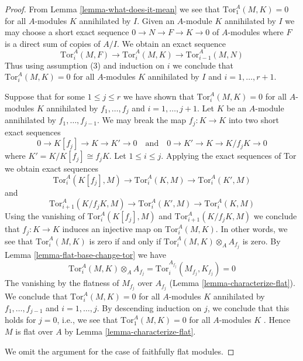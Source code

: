 \begin{proof}
From Lemma \ref{lemma-what-does-it-mean} we see that
$\text{Tor}_1^A(M, K) = 0$ for all $A$-modules $K$ annihilated by $I$.
Given an $A$-module $K$ annihilated by $I$ we may choose a short
exact sequence $0 \to N \to F \to K \to 0$ of $A$-modules where $F$
is a direct sum of copies of $A/I$. We obtain an exact sequence
$$
\text{Tor}_i^A(M, F) \to
\text{Tor}_i^A(M, K) \to
\text{Tor}_{i - 1}^A(M, N)
$$
Thus using assumption (3) and induction on $i$
we conclude that $\text{Tor}_i^A(M, K) = 0$
for all $A$-modules $K$ annihilated by $I$ and $i = 1, \ldots, r + 1$.

\medskip\noindent
Suppose that for some $1 \leq j \leq r$
we have shown that $\text{Tor}_i^A(M, K) = 0$
for all $A$-modules $K$ annihilated by $f_1, \ldots, f_j$
and $i = 1, \ldots, j + 1$.
Let $K$ be an $A$-module annihilated by $f_1, \ldots, f_{j - 1}$.
We may break the map $f_j : K \to K$ into two short exact sequences
$$
0 \to K[f_j] \to K \to K' \to 0
\quad\text{and}\quad
0 \to K' \to K \to K/f_jK \to 0
$$
where $K' = K/K[f_j] \cong f_jK$. Let $1 \leq i \leq j$.  Applying the exact
sequences of Tor we obtain exact sequences
$$
\text{Tor}_i^A(K[f_j], M) \to
\text{Tor}_i^A(K, M) \to
\text{Tor}_i^A(K', M)
$$
and
$$
\text{Tor}_{i + 1}^A(K/f_jK, M) \to
\text{Tor}_i^A(K', M) \to
\text{Tor}_i^A(K, M)
$$
Using the vanishing of $\text{Tor}_i^A(K[f_j], M)$ and
$\text{Tor}_{i + 1}^A(K/f_jK, M)$ we conclude that $f_j : K \to K$
induces an injective map on $\text{Tor}^A_i(M, K)$.
In other words, we see that $\text{Tor}^A_i(M, K)$
is zero if and only if $\text{Tor}^A_i(M, K) \otimes_A A_{f_j}$ is zero.
By Lemma \ref{lemma-flat-base-change-tor} we have
$$
\text{Tor}^A_i(M, K) \otimes_A A_{f_j} =
\text{Tor}^{A_{f_j}}_i(M_{f_j}, K_{f_j})  = 0
$$
The vanishing by the flatness of $M_{f_j}$ over $A_{f_j}$
(Lemma \ref{lemma-characterize-flat}).
We conclude that $\text{Tor}_i^A(M, K) = 0$
for all $A$-modules $K$ annihilated by $f_1, \ldots, f_{j - 1}$
and $i = 1, \ldots, j$.
By descending induction on $j$, we conclude that
this holds for $j = 0$, i.e., we see that
$\text{Tor}_1^A(M, K) = 0$
for all $A$-modules $K$ . Hence
$M$ is flat over $A$ by Lemma \ref{lemma-characterize-flat}.

\medskip\noindent
We omit the argument for the case of faithfully flat modules.
\end{proof}








